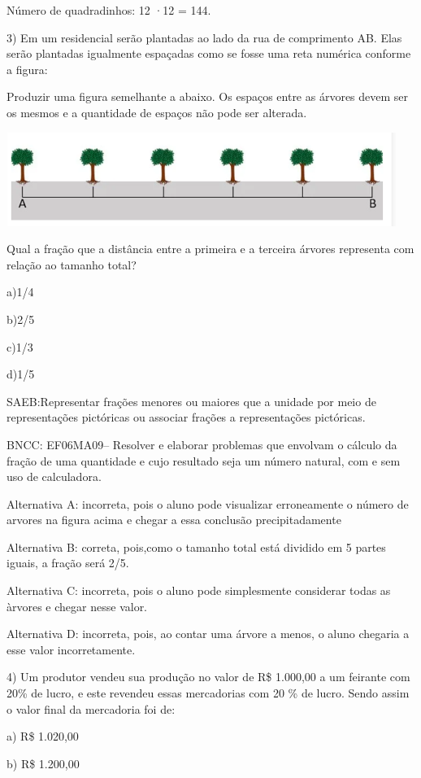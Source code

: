 Número de quadradinhos: 12 ·12 = 144.

3) Em um residencial serão plantadas ao lado da rua de comprimento AB.
Elas serão plantadas igualmente espaçadas como se fosse uma reta
numérica conforme a figura:

Produzir uma figura semelhante a abaixo. Os espaços entre as árvores
devem ser os mesmos e a quantidade de espaços não pode ser alterada.

\includegraphics[width=5in,height=1.19792in]{./imgSAEB_6_MAT/media/image109.png}

Qual a fração que a distância entre a primeira e a terceira árvores
representa com relação ao tamanho total?

a)1/4

b)2/5

c)1/3

d)1/5

SAEB:Representar frações menores ou maiores que a unidade por meio de
representações pictóricas ou associar frações a representações
pictóricas.

BNCC: EF06MA09-- Resolver e elaborar problemas que envolvam o cálculo da
fração de uma quantidade e cujo resultado seja um número natural, com e
sem uso de calculadora.

Alternativa A: incorreta, pois o aluno pode visualizar erroneamente o
número de arvores na figura acima e chegar a essa conclusão
precipitadamente

Alternativa B: correta, pois,como o tamanho total está dividido em 5
partes iguais, a fração será 2/5.

Alternativa C: incorreta, pois o aluno pode simplesmente considerar
todas as àrvores e chegar nesse valor.

Alternativa D: incorreta, pois, ao contar uma árvore a menos, o aluno
chegaria a esse valor incorretamente.

4) Um produtor vendeu sua produção no valor de R\$ 1.000,00 a um
feirante com 20\% de lucro, e este revendeu essas mercadorias com 20 \%
de lucro. Sendo assim o valor final da mercadoria foi de:

a) R\$ 1.020,00

b) R\$ 1.200,00

